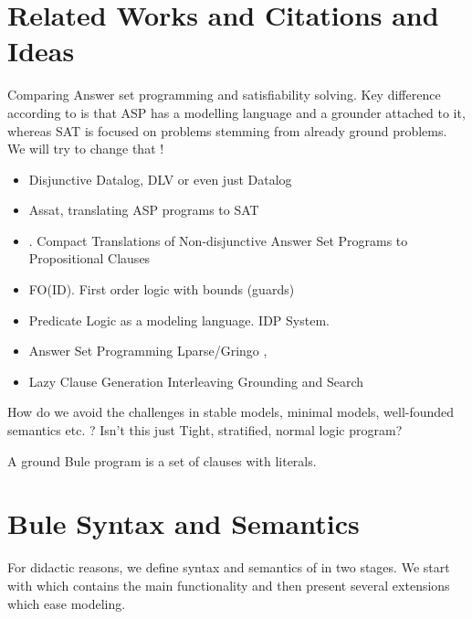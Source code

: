 \documentclass[conference]{IEEEtran}
\begin{document}
\section{Related Works and Citations and Ideas}


Comparing Answer set programming and satisfiability solving. Key difference
according to \cite{Lierler17} is that ASP has a modelling language and a
grounder attached to it, whereas SAT is focused on problems stemming from
already ground problems. We will try to change that !


\begin{itemize}
    \item Disjunctive Datalog, DLV \cite{Eiter97} or even just Datalog \cite{Gottlob89}
    \item Assat, translating ASP programs to SAT \cite{Lin04}
    \item \cite{Janhunen11}. Compact Translations of Non-disjunctive Answer Set
        Programs to Propositional Clauses
    \item FO(ID). First order logic with bounds (guards) \cite{Wittocx10}
    \item Predicate Logic as a modeling language. IDP System. \cite{Cat18}
    \item Answer Set Programming Lparse/Gringo \cite{Gebser15}, \cite{Ferraris05}
    \item Lazy Clause Generation Interleaving Grounding and Search \cite{Cat15}
\end{itemize}

How do we avoid the challenges in stable models, minimal models, well-founded
semantics etc. ?  Isn't this just Tight, stratified, normal logic program?


A ground Bule program is a set of clauses with literals. 

\section{Bule Syntax and Semantics}

For didactic reasons, we define syntax and semantics of \bule in two
stages. We start with \bcore which contains the main functionality and
then present several extensions which ease modeling. 

\subsection{\bcore}
\end{document}
